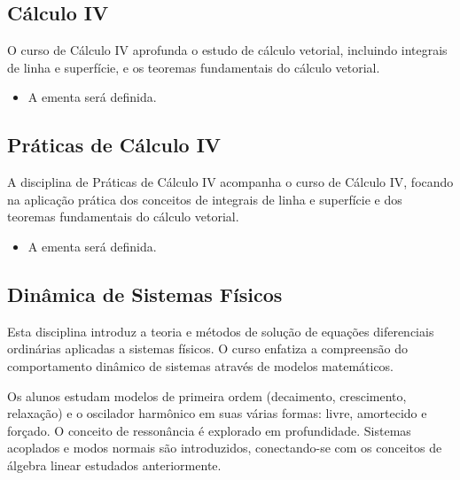 \documentclass[a4paper, 12pt]{article}
\newcounter{mat}
\begin{document}
\subsection{Cálculo IV}
\label{mat008}

O curso de Cálculo IV aprofunda o estudo de cálculo vetorial, incluindo integrais de
linha e superfície, e os teoremas fundamentais do cálculo vetorial.

\begin{tcolorbox}[title=Ementa:]
    \begin{itemize}
        \item A ementa será definida.
    \end{itemize}
\end{tcolorbox}

\subsection{Práticas de Cálculo IV}
\label{mat009}

A disciplina de Práticas de Cálculo IV acompanha o curso de Cálculo IV, focando na
aplicação prática dos conceitos de integrais de linha e superfície e dos teoremas
fundamentais do cálculo vetorial.

\begin{tcolorbox}[title=Ementa:]
    \begin{itemize}
        \item A ementa será definida.
    \end{itemize}
\end{tcolorbox}

\subsection{Dinâmica de Sistemas Físicos}
\label{mat010}

Esta disciplina introduz a teoria e métodos de solução de equações diferenciais
ordinárias aplicadas a sistemas físicos. O curso enfatiza a compreensão do comportamento
dinâmico de sistemas através de modelos matemáticos.

Os alunos estudam modelos de primeira ordem (decaimento, crescimento, relaxação) e o
oscilador harmônico em suas várias formas: livre, amortecido e forçado. O conceito de
ressonância é explorado em profundidade. Sistemas acoplados e modos normais são
introduzidos, conectando-se com os conceitos de álgebra linear estudados anteriormente.
\end{document}
